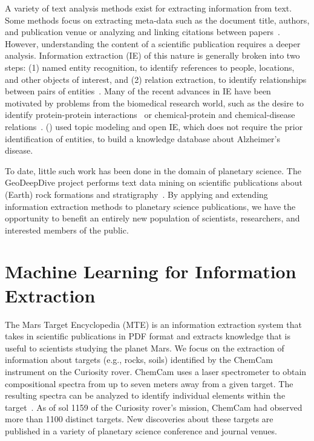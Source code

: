 \documentclass[letterpaper]{article} %
\begin{document}
A variety of text analysis methods exist for extracting information
from text.  Some methods focus on extracting meta-data such as the
document title, authors, and publication venue or analyzing and
linking citations between papers~\cite{ronzano:scipub16}.
%
However, understanding the content of a scientific publication
requires a deeper analysis.  Information extraction (IE) of this
nature is generally broken into two steps: (1) named entity
recognition, to identify references to people, locations, and other
objects of interest, and (2) relation extraction, to identify
relationships between pairs of entities~\cite{mooney:ie05}.  Many of
the recent advances in IE have been motivated by problems from the
biomedical research world, such as the desire to identify
protein-protein interactions~\cite{tikk:protein10,bui:protein11} or
chemical-protein and chemical-disease
relations~\cite{krallinger:chemistry17}.  \citeauthor{tsutsui:ad16}
(\citeyear{tsutsui:ad16}) used topic modeling and open IE, which does
not require the prior identification of entities, to build a knowledge
database about Alzheimer's disease.

To date, little such work has been done in the domain of planetary
science. The GeoDeepDive project performs text data mining on
scientific publications about (Earth) rock formations and
stratigraphy~\cite{zhang:geodeepdive13}.
%
By applying and extending information extraction methods to planetary
science publications, we have the opportunity to benefit an entirely
new population of scientists, researchers, and interested members of
the public.

\section{Machine Learning for Information Extraction}

The Mars Target Encyclopedia (MTE) is an information extraction system
that takes in scientific publications in PDF format and extracts
knowledge that is useful to scientists studying the planet Mars.
%
We focus on the extraction of information about targets (e.g., rocks,
soils) identified by the ChemCam instrument on the Curiosity rover.
ChemCam uses a laser spectrometer to obtain compositional spectra from
up to seven meters away from a given target. The resulting spectra can
be analyzed to identify individual elements within the
target~\cite{maurice:chemcam12}.  As of sol 1159 of the Curiosity
rover's mission, ChemCam had observed more than 1100 distinct targets.
New discoveries about these targets are published in a variety of
planetary science conference and journal venues.
\end{document}
